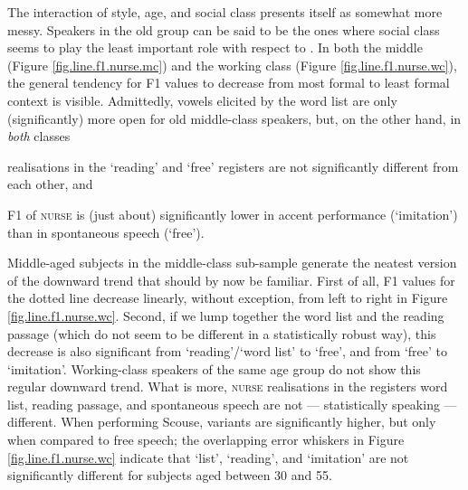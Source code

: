 The interaction of style, age, and social class presents itself as somewhat more messy.
Speakers in the old group can be said to be the ones where social class seems to play the least important role with respect to .
In both the middle (Figure \ref{fig.line.f1.nurse.mc}) and the working class (Figure \ref{fig.line.f1.nurse.wc}), the general tendency for F1 values to decrease from most formal to least formal context is visible.
Admittedly, vowels elicited by the word list are only (significantly) more open for old middle-class speakers, but, on the other hand, in \emph{both} classes
\begin{inparaenum}[(a)]
	\item realisations in the `reading' and `free' registers are not significantly different from each other, and
	\item F1 of \textsc{nurse} is (just about) significantly lower in accent performance (`imitation') than in spontaneous speech (`free').
\end{inparaenum}

Middle-aged subjects in the middle-class sub-sample generate the neatest version of the downward trend that should by now be familiar.
First of all, F1 values for the dotted line decrease linearly, without exception, from left to right in Figure \ref{fig.line.f1.nurse.wc}.
Second, if we lump together the word list and the reading passage (which do not seem to be different in a statistically robust way), this decrease is also significant from `reading'/`word list' to `free', and from `free' to `imitation'.
Working-class speakers of the same age group do not show this regular downward trend.
What is more, \textsc{nurse} realisations in the registers word list, reading passage, and spontaneous speech are not --- statistically speaking --- different.
When performing Scouse, variants are significantly higher, but only when compared to free speech; the overlapping error whiskers in Figure \ref{fig.line.f1.nurse.wc} indicate that `list', `reading', and `imitation' are not significantly different for subjects aged between 30 and 55.

